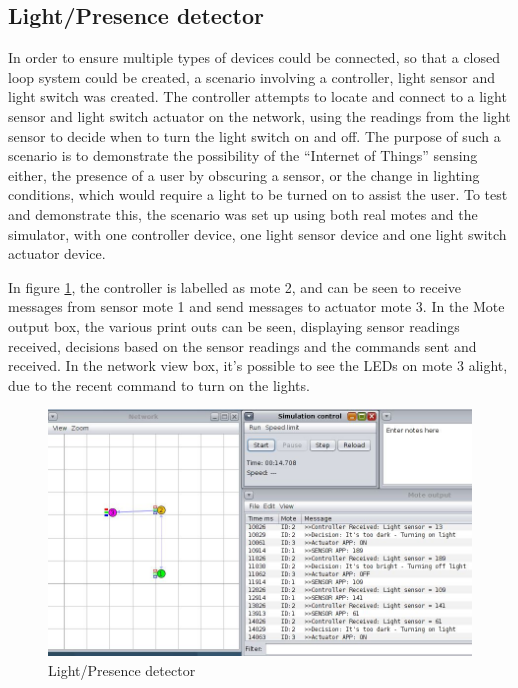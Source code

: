 \subsection{Light/Presence detector} %
\label{sub:presence_detector}
In order to ensure multiple types of devices could be connected, so that a closed loop system could be created, a scenario involving a controller, light sensor and light switch was created. The controller attempts to locate and connect to a light sensor and light switch actuator on the network, using the readings from the light sensor to decide when to turn the light switch on and off. The purpose of such a scenario is to demonstrate the possibility of the ``Internet of Things'' sensing either, the presence of a user by obscuring a sensor, or the change in lighting conditions, which would require a light to be turned on to assist the user.
To test and demonstrate this, the scenario was set up using both real motes and the simulator, with one controller device, one light sensor device and one light switch actuator device.

In figure \ref{fig:lighttest}, the controller is labelled as mote 2, and can be seen to receive messages from sensor mote 1 and send messages to actuator mote 3. In the Mote output box, the various print outs can be seen, displaying sensor readings received, decisions based on the sensor readings and the commands sent and received. In the network view box, it's possible to see the LEDs on mote 3 alight, due to the recent command to turn on the lights.

\begin{figure}[h]
\centering
\includegraphics[scale=0.5]{evaluation/img/lightswitch.jpg}
\caption{Light/Presence detector}
\label{fig:lighttest}
\end{figure}

